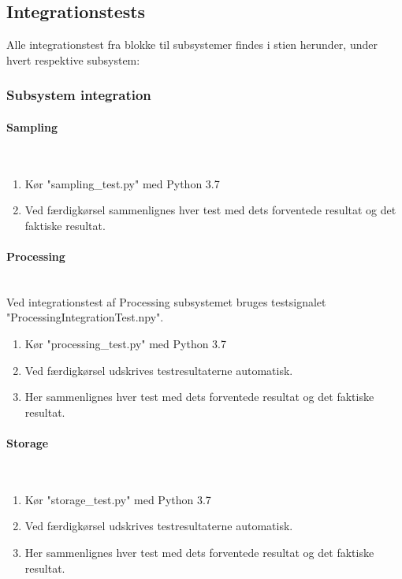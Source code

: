 \begin{appendices}
\pagebreak

\subsection{Integrationstests}

Alle integrationstest fra blokke til subsystemer findes i stien herunder, under hvert respektive subsystem: \newline
{}

\subsubsection{Subsystem integration}

\paragraph{Sampling} \mbox{}\\

\begin{enumerate}
	\item Kør "sampling\_test.py" med Python 3.7
	\item Ved færdigkørsel sammenlignes hver test med dets forventede resultat og det faktiske resultat.
\end{enumerate}

\paragraph{Processing} \mbox{}\\
Ved integrationstest af Processing subsystemet bruges testsignalet "ProcessingIntegrationTest.npy".

\begin{enumerate}
	\item Kør "processing\_test.py" med Python 3.7
	\item Ved færdigkørsel udskrives testresultaterne automatisk.
	\item Her sammenlignes hver test med dets forventede resultat og det faktiske resultat.
\end{enumerate}

\paragraph{Storage} \mbox{}\\

\begin{enumerate}
	\item Kør "storage\_test.py" med Python 3.7
	\item Ved færdigkørsel udskrives testresultaterne automatisk.
	\item Her sammenlignes hver test med dets forventede resultat og det faktiske resultat.
\end{enumerate}


\end{appendices}
